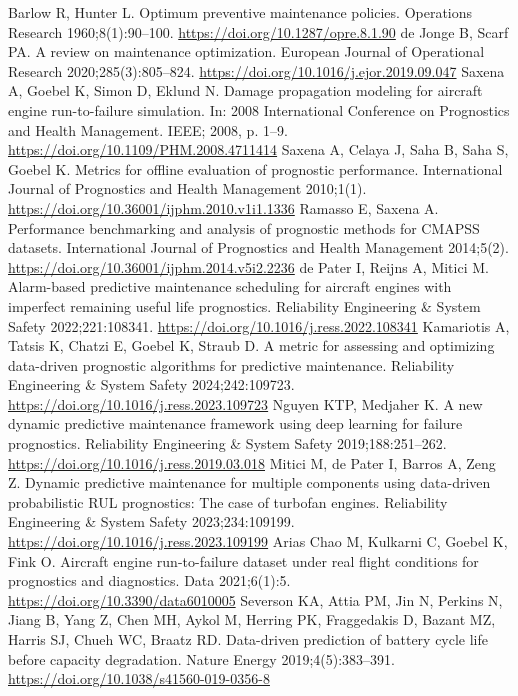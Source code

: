  Barlow R, Hunter L. Optimum preventive maintenance policies. Operations Research 1960;8(1):90--100. \url{https://doi.org/10.1287/opre.8.1.90}
 de Jonge B, Scarf PA. A review on maintenance optimization. European Journal of Operational Research 2020;285(3):805--824. \url{https://doi.org/10.1016/j.ejor.2019.09.047}
 Saxena A, Goebel K, Simon D, Eklund N. Damage propagation modeling for aircraft engine run-to-failure simulation. In: 2008 International Conference on Prognostics and Health Management. IEEE; 2008, p. 1--9. \url{https://doi.org/10.1109/PHM.2008.4711414}
 Saxena A, Celaya J, Saha B, Saha S, Goebel K. Metrics for offline evaluation of prognostic performance. International Journal of Prognostics and Health Management 2010;1(1). \url{https://doi.org/10.36001/ijphm.2010.v1i1.1336}
 Ramasso E, Saxena A. Performance benchmarking and analysis of prognostic methods for CMAPSS datasets. International Journal of Prognostics and Health Management 2014;5(2). \url{https://doi.org/10.36001/ijphm.2014.v5i2.2236}
 de Pater I, Reijns A, Mitici M. Alarm-based predictive maintenance scheduling for aircraft engines with imperfect remaining useful life prognostics. Reliability Engineering \& System Safety 2022;221:108341. \url{https://doi.org/10.1016/j.ress.2022.108341}
 Kamariotis A, Tatsis K, Chatzi E, Goebel K, Straub D. A metric for assessing and optimizing data-driven prognostic algorithms for predictive maintenance. Reliability Engineering \& System Safety 2024;242:109723. \url{https://doi.org/10.1016/j.ress.2023.109723}
 Nguyen KTP, Medjaher K. A new dynamic predictive maintenance framework using deep learning for failure prognostics. Reliability Engineering \& System Safety 2019;188:251--262. \url{https://doi.org/10.1016/j.ress.2019.03.018}
 Mitici M, de Pater I, Barros A, Zeng Z. Dynamic predictive maintenance for multiple components using data-driven probabilistic RUL prognostics: The case of turbofan engines. Reliability Engineering \& System Safety 2023;234:109199. \url{https://doi.org/10.1016/j.ress.2023.109199}
 Arias Chao M, Kulkarni C, Goebel K, Fink O. Aircraft engine run-to-failure dataset under real flight conditions for prognostics and diagnostics. Data 2021;6(1):5. \url{https://doi.org/10.3390/data6010005}
 Severson KA, Attia PM, Jin N, Perkins N, Jiang B, Yang Z, Chen MH, Aykol M, Herring PK, Fraggedakis D, Bazant MZ, Harris SJ, Chueh WC, Braatz RD. Data-driven prediction of battery cycle life before capacity degradation. Nature Energy 2019;4(5):383--391. \url{https://doi.org/10.1038/s41560-019-0356-8}
